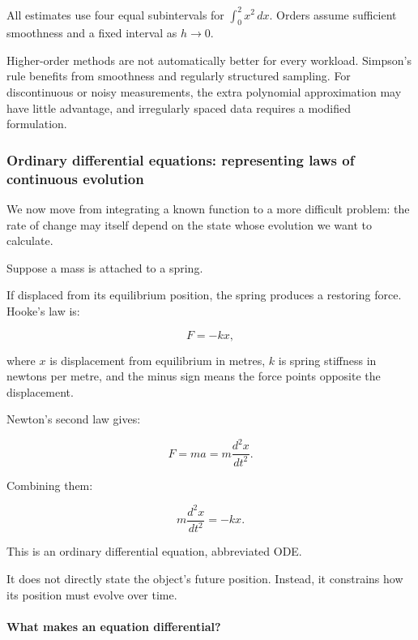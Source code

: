 All estimates use four equal subintervals for \(\int_0^2x^2\,dx\). Orders assume sufficient smoothness and a fixed interval as \(h\to0\).

Higher-order methods are not automatically better for every workload. Simpson's rule benefits from smoothness and regularly structured sampling. For discontinuous or noisy measurements, the extra polynomial approximation may have little advantage, and irregularly spaced data requires a modified formulation.

\subsubsection{Ordinary differential equations: representing laws of continuous evolution}\label{02-foundations-ii-ch022-ordinary-differential-equations-representing-laws-of-continuous-evolution}

\hypertarget{02-foundations-ii-ch022-ordinary-differential-equations-representing-laws-of-continuous-evolution}{}

We now move from integrating a known function to a more difficult problem: the rate of change may itself depend on the state whose evolution we want to calculate.

Suppose a mass is attached to a spring.

If displaced from its equilibrium position, the spring produces a restoring force. Hooke's law is:

\[
F=-kx,
\]

where \(x\) is displacement from equilibrium in metres, \(k\) is spring stiffness in newtons per metre, and the minus sign means the force points opposite the displacement.

Newton's second law gives:

\[
F=ma=m\frac{d^2x}{dt^2}.
\]

Combining them:

\[
\boxed{m\frac{d^2x}{dt^2}=-kx}.
\]

This is an ordinary differential equation, abbreviated ODE.

It does not directly state the object's future position. Instead, it constrains how its position must evolve over time.

\paragraph{What makes an equation differential?}\label{02-foundations-ii-ch022-what-makes-an-equation-differential}

